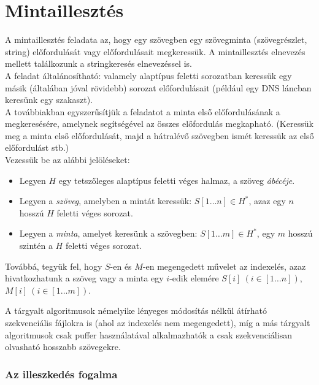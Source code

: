 \documentclass[margin=0px]{article}
\begin{document}
	\section*{Mintaillesztés}

    \noindent A mintaillesztés feladata az, hogy egy szövegben egy szövegminta (szövegrészlet, string) előfordulását vagy előfordulásait megkeressük. A mintaillesztés elnevezés mellett találkozunk a stringkeresés elnevezéssel is.\\

    \noindent A feladat általánosítható: valamely alaptípus feletti sorozatban keressük egy másik (általában jóval rövidebb) sorozat előfordulásait (például egy DNS láncban keresünk egy szakaszt).\\

    \noindent A továbbiakban egyszerűsítjük a feladatot a minta első előfordulásának a megkeresésére, amelynek segítségével az összes előfordulás megkapható. (Keressük meg a minta első előfordulását, majd a hátralévő szövegben ismét keressük az első előfordulást stb.)\\

    \noindent Vezessük be az alábbi jelöléseket:
    \begin{itemize}
        \item Legyen $H$ egy tetszőleges alaptípus feletti véges halmaz, a szöveg \emph{ábécéje}.
        \item Legyen a \emph{szöveg}, amelyben a mintát keressük: $S[1 \ldots n] \in H^{*}$, azaz egy $n$ hosszú $H$ feletti véges sorozat.
        \item Legyen a \emph{minta}, amelyet keresünk a szövegben: $S[1 \ldots m] \in H^{*}$, egy $m$ hosszú szintén a $H$ feletti véges sorozat.
    \end{itemize}
    \noindent Továbbá, tegyük fel, hogy $S$-en és $M$-en megengedett művelet az indexelés, azaz hivatkozhatunk a szöveg vagy a minta egy $i$-edik elemére $S[i]\ (i \in [1 \ldots n])$, $M[i]\ (i \in [1 \ldots m])$.

    \noindent A tárgyalt algoritmusok némelyike lényeges módosítás nélkül átírható szekvenciális fájlokra is (ahol az indexelés nem megengedett), míg a más tárgyalt algoritmusok csak puffer használatával alkalmazhatók a csak szekvenciálisan olvasható hosszabb szövegekre.

    \subsubsection*{Az illeszkedés fogalma}
\end{document}
